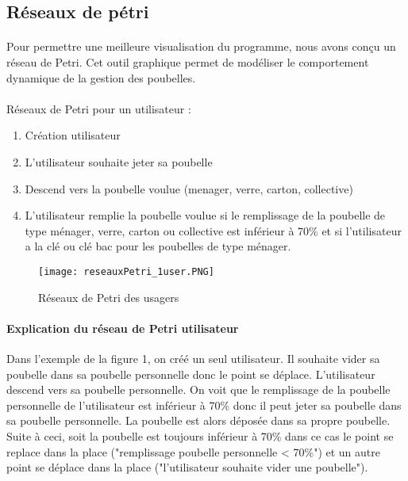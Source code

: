 \documentclass[12pt]{article}
\begin{document}
\subsection{Réseaux de pétri}
\paragraph{} Pour permettre une meilleure visualisation du programme, nous avons conçu un réseau de Petri. Cet outil graphique permet de modéliser le comportement dynamique de la gestion des poubelles.

\paragraph{}Réseaux de Petri pour un utilisateur : 
\begin{enumerate}
\item Création utilisateur 
\item L'utilisateur souhaite jeter sa poubelle
\item Descend vers la poubelle voulue (menager, verre, carton, collective)
\item L'utilisateur remplie la poubelle voulue si le remplissage de la poubelle de type ménager, verre, carton ou collective est inférieur à 70\% et si l'utilisateur a la clé ou clé bac pour les poubelles de type ménager.
\end{enumerate}

\begin{landscape}
\begin{figure}[h]
	\begin{center}
		\texttt{[image: reseauxPetri\_1user.PNG]}
	\end{center}
	\caption{Réseaux de Petri des usagers}
\label{Petri}
\end{figure}
\end{landscape}
\paragraph{Explication du réseau de Petri utilisateur} Dans l'exemple de la figure 1, on créé un seul utilisateur. Il souhaite vider sa poubelle dans sa poubelle personnelle donc le point se déplace. L'utilisateur descend vers sa poubelle personnelle. On voit que le remplissage de la poubelle personnelle de l'utilisateur est inférieur à 70\% donc il peut jeter sa poubelle dans sa poubelle personnelle. La poubelle est alors déposée dans sa propre poubelle. Suite à ceci, soit la poubelle est toujours inférieur à 70\% dans ce cas le point se replace dans la place ("remplissage poubelle personnelle < 70\%") et un autre point se déplace dans la place ("l'utilisateur souhaite vider une poubelle"). 
\end{document}
